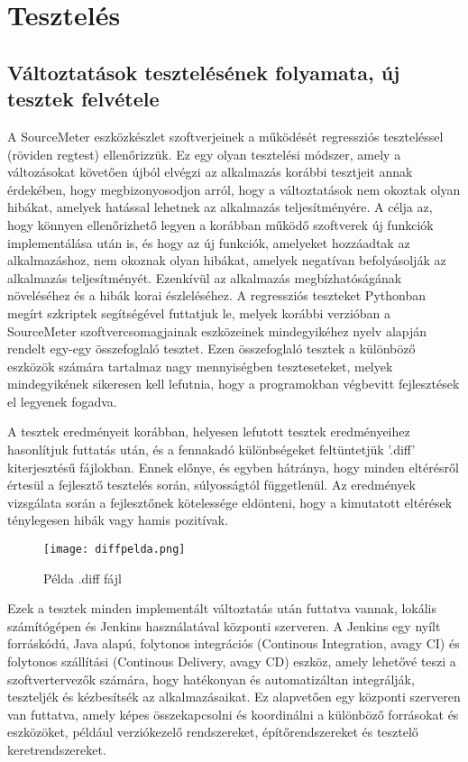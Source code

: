 \chapter{Tesztelés}
\label{chap:fejezet5}

\section{Változtatások tesztelésének folyamata, új tesztek felvétele}

A SourceMeter eszközkészlet szoftverjeinek a működését regressziós teszteléssel (röviden regtest) ellenőrizzük. Ez egy olyan tesztelési módszer, amely a változásokat követően újból elvégzi az alkalmazás korábbi tesztjeit annak érdekében, hogy megbizonyosodjon arról, hogy a változtatások nem okoztak olyan hibákat, amelyek hatással lehetnek az alkalmazás teljesítményére.
A célja az, hogy könnyen ellenőrizhető legyen a korábban működő szoftverek új funkciók implementálása után is, és hogy az új funkciók, amelyeket hozzáadtak az alkalmazáshoz, nem okoznak olyan hibákat, amelyek negatívan befolyásolják az alkalmazás teljesítményét. Ezenkívül az alkalmazás megbízhatóságának növeléséhez és a hibák korai észleléséhez.
A regressziós teszteket Pythonban megírt szkriptek segítségével futtatjuk le, melyek korábbi verzióban a SourceMeter szoftvercsomagjainak eszközeinek mindegyikéhez nyelv alapján rendelt egy-egy összefoglaló tesztet. Ezen összefoglaló tesztek a különböző eszközök számára tartalmaz nagy mennyiségben teszteseteket, melyek mindegyikének sikeresen kell lefutnia, hogy a programokban végbevitt fejlesztések el legyenek fogadva.

A tesztek eredményeit korábban, helyesen lefutott tesztek eredményeihez hasonlítjuk futtatás után, és a fennakadó különbségeket feltüntetjük '.diff' kiterjesztésű fájlokban. Ennek előnye, és egyben hátránya, hogy minden eltérésről értesül a fejlesztő tesztelés során, súlyosságtól függetlenül. Az eredmények vizsgálata során a fejlesztőnek kötelessége eldönteni, hogy a kimutatott eltérések ténylegesen hibák vagy hamis pozitívak.

\begin{figure}[!htbp]
    \caption{Példa .diff fájl}\label{fig:difffile}
    \centering
    \texttt{[image: diffpelda.png]}
\end{figure}

Ezek a tesztek minden implementált változtatás után futtatva vannak, lokális számítógépen és Jenkins használatával központi szerveren. 
A Jenkins egy nyílt forráskódú, Java alapú, folytonos integrációs (Continous Integration, avagy CI) és folytonos szállítási (Continous Delivery, avagy CD) eszköz, amely lehetővé teszi a szoftvertervezők számára, hogy hatékonyan és automatizáltan integrálják, teszteljék és kézbesítsék az alkalmazásaikat. Ez alapvetően egy központi szerveren van futtatva, amely képes összekapcsolni és koordinálni a különböző forrásokat és eszközöket, például verziókezelő rendszereket, építőrendszereket és tesztelő keretrendszereket.

